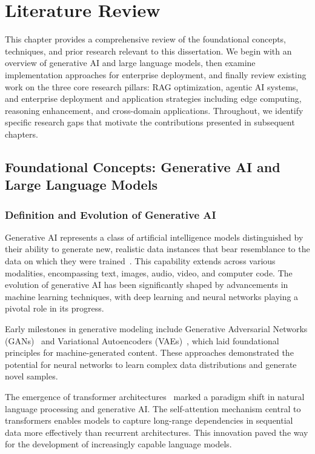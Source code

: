 \chapter{Literature Review}
\label{ch:literature}

This chapter provides a comprehensive review of the foundational concepts, techniques, and prior research relevant to this dissertation. We begin with an overview of generative AI and large language models, then examine implementation approaches for enterprise deployment, and finally review existing work on the three core research pillars: RAG optimization, agentic AI systems, and enterprise deployment and application strategies including edge computing, reasoning enhancement, and cross-domain applications. Throughout, we identify specific research gaps that motivate the contributions presented in subsequent chapters.

\section{Foundational Concepts: Generative AI and Large Language Models}
\label{sec:lit_foundations}

\subsection{Definition and Evolution of Generative AI}

Generative AI represents a class of artificial intelligence models distinguished by their ability to generate new, realistic data instances that bear resemblance to the data on which they were trained~\cite{goodfellow2014generative}. This capability extends across various modalities, encompassing text, images, audio, video, and computer code. The evolution of generative AI has been significantly shaped by advancements in machine learning techniques, with deep learning and neural networks playing a pivotal role in its progress.

Early milestones in generative modeling include Generative Adversarial Networks (GANs)~\cite{goodfellow2014generative} and Variational Autoencoders (VAEs)~\cite{kingma2014vae}, which laid foundational principles for machine-generated content. These approaches demonstrated the potential for neural networks to learn complex data distributions and generate novel samples.

The emergence of transformer architectures~\cite{vaswani2017attention} marked a paradigm shift in natural language processing and generative AI. The self-attention mechanism central to transformers enables models to capture long-range dependencies in sequential data more effectively than recurrent architectures. This innovation paved the way for the development of increasingly capable language models.

